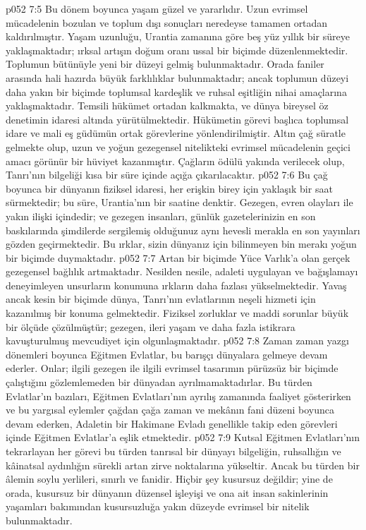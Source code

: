 \vs p052 7:5 Bu dönem boyunca yaşam güzel ve yararlıdır. Uzun evrimsel mücadelenin bozulan ve toplum dışı sonuçları neredeyse tamamen ortadan kaldırılmıştır. Yaşam uzunluğu, Urantia zamanına göre beş yüz yıllık bir süreye yaklaşmaktadır; ırksal artışın doğum oranı ussal bir biçimde düzenlenmektedir. Toplumun bütünüyle yeni bir düzeyi gelmiş bulunmaktadır. Orada faniler arasında hali hazırda büyük farklılıklar bulunmaktadır; ancak toplumun düzeyi daha yakın bir biçimde toplumsal kardeşlik ve ruhsal eşitliğin nihai amaçlarına yaklaşmaktadır. Temsili hükümet ortadan kalkmakta, ve dünya bireysel öz denetimin idaresi altında yürütülmektedir. Hükümetin görevi başlıca toplumsal idare ve mali eş güdümün ortak görevlerine yönlendirilmiştir. Altın çağ süratle gelmekte olup, uzun ve yoğun gezegensel nitelikteki evrimsel mücadelenin geçici amacı görünür bir hüviyet kazanmıştır. Çağların ödülü yakında verilecek olup, Tanrı’nın bilgeliği kısa bir süre içinde açığa çıkarılacaktır.
\vs p052 7:6 Bu çağ boyunca bir dünyanın fiziksel idaresi, her erişkin birey için yaklaşık bir saat sürmektedir; bu süre, Urantia’nın bir saatine denktir. Gezegen, evren olayları ile yakın ilişki içindedir; ve gezegen insanları, günlük gazetelerinizin en son baskılarında şimdilerde sergilemiş olduğunuz aynı hevesli merakla en son yayınları gözden geçirmektedir. Bu ırklar, sizin dünyanız için bilinmeyen bin merakı yoğun bir biçimde duymaktadır.
\vs p052 7:7 Artan bir biçimde Yüce Varlık’a olan gerçek gezegensel bağlılık artmaktadır. Nesilden nesile, adaleti uygulayan ve bağışlamayı deneyimleyen unsurların konumuna ırkların daha fazlası yükselmektedir. Yavaş ancak kesin bir biçimde dünya, Tanrı’nın evlatlarının neşeli hizmeti için kazanılmış bir konuma gelmektedir. Fiziksel zorluklar ve maddi sorunlar büyük bir ölçüde çözülmüştür; gezegen, ileri yaşam ve daha fazla istikrara kavuşturulmuş mevcudiyet için olgunlaşmaktadır.
\vs p052 7:8 Zaman zaman yazgı dönemleri boyunca Eğitmen Evlatlar, bu barışçı dünyalara gelmeye devam ederler. Onlar; ilgili gezegen ile ilgili evrimsel tasarımın pürüzsüz bir biçimde çalıştığını gözlemlemeden bir dünyadan ayrılmamaktadırlar. Bu türden Evlatlar’ın bazıları, Eğitmen Evlatları’nın ayrılış zamanında faaliyet gösterirken ve bu yargısal eylemler çağdan çağa zaman ve mekânın fani düzeni boyunca devam ederken, Adaletin bir Hakimane Evladı genellikle takip eden görevleri içinde Eğitmen Evlatlar’a eşlik etmektedir.
\vs p052 7:9 Kutsal Eğitmen Evlatları’nın tekrarlayan her görevi bu türden tanrısal bir dünyayı bilgeliğin, ruhsallığın ve kâinatsal aydınlığın sürekli artan zirve noktalarına yükseltir. Ancak bu türden bir âlemin soylu yerlileri, sınırlı ve fanidir. Hiçbir şey kusursuz değildir; yine de orada, kusursuz bir dünyanın düzensel işleyişi ve ona ait insan sakinlerinin yaşamları bakımından kusursuzluğa yakın düzeyde evrimsel bir nitelik bulunmaktadır.
